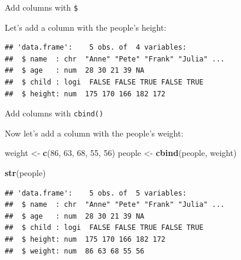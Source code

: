 \documentclass[ignorenonframetext,]{beamer}
\newenvironment{Shaded}{\begin{snugshade}}{\end{snugshade}}
\newcommand{\DecValTok}[1]{\textcolor[rgb]{0.00,0.00,0.81}{#1}}
\newcommand{\KeywordTok}[1]{\textcolor[rgb]{0.13,0.29,0.53}{\textbf{#1}}}
\newcommand{\NormalTok}[1]{#1}
\newcommand{\OperatorTok}[1]{\textcolor[rgb]{0.81,0.36,0.00}{\textbf{#1}}}
\newcommand{\StringTok}[1]{\textcolor[rgb]{0.31,0.60,0.02}{#1}}
\begin{document}
\begin{frame}[fragile]{Add columns with \texttt{\$}}
\protect\hypertarget{add-columns-with-1}{}

Let's add a column with the people's height:

\begin{Shaded}
\end{Shaded}

\begin{verbatim}
## 'data.frame':    5 obs. of  4 variables:
##  $ name  : chr  "Anne" "Pete" "Frank" "Julia" ...
##  $ age   : num  28 30 21 39 NA
##  $ child : logi  FALSE FALSE TRUE FALSE TRUE
##  $ height: num  175 170 166 182 172
\end{verbatim}

\end{frame}

\begin{frame}[fragile]{Add columns with \texttt{cbind()}}
\protect\hypertarget{add-columns-with-cbind}{}

Now let's add a column with the people's weight:

\begin{Shaded}
\begin{Highlighting}[]
\NormalTok{ weight <-}\StringTok{ }\KeywordTok{c}\NormalTok{(}\DecValTok{86}\NormalTok{, }\DecValTok{63}\NormalTok{, }\DecValTok{68}\NormalTok{, }\DecValTok{55}\NormalTok{, }\DecValTok{56}\NormalTok{)}
\NormalTok{ people <-}\StringTok{ }\KeywordTok{cbind}\NormalTok{(people, weight)}
 
 \KeywordTok{str}\NormalTok{(people)}
\end{Highlighting}
\end{Shaded}

\begin{verbatim}
## 'data.frame':    5 obs. of  5 variables:
##  $ name  : chr  "Anne" "Pete" "Frank" "Julia" ...
##  $ age   : num  28 30 21 39 NA
##  $ child : logi  FALSE FALSE TRUE FALSE TRUE
##  $ height: num  175 170 166 182 172
##  $ weight: num  86 63 68 55 56
\end{verbatim}

\end{frame}
\end{document}

